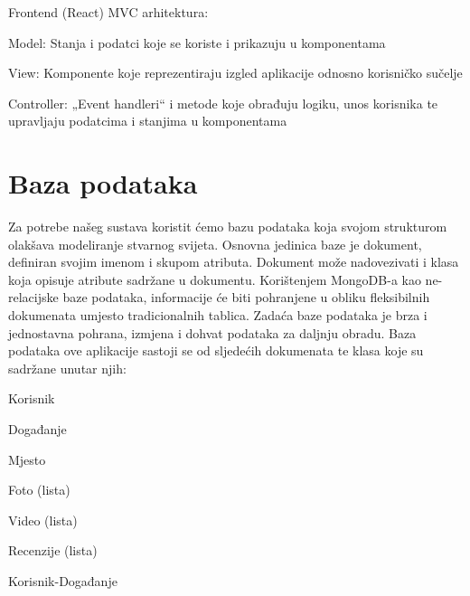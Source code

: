 	Frontend (React) MVC arhitektura:
	
	\begin{packed_enum}
	
		\item Model: Stanja i podatci koje se koriste i prikazuju u komponentama
		\item View: Komponente koje reprezentiraju izgled aplikacije odnosno korisničko sučelje
		\item Controller: „Event handleri“ i metode koje obrađuju logiku, unos korisnika te upravljaju podatcima i stanjima u komponentama 
							
	\end{packed_enum}
		

				
		\section{Baza podataka}
			
			Za potrebe našeg sustava koristit ćemo bazu podataka koja svojom strukturom olakšava modeliranje stvarnog svijeta. Osnovna jedinica baze je dokument, definiran svojim imenom i skupom atributa. Dokument može nadovezivati i klasa koja opisuje atribute sadržane u dokumentu. Korištenjem MongoDB-a kao ne-relacijske baze podataka, informacije će biti pohranjene u obliku fleksibilnih dokumenata umjesto tradicionalnih tablica. Zadaća baze podataka je brza i jednostavna pohrana, izmjena i dohvat podataka za daljnju obradu. Baza podataka ove aplikacije sastoji se od sljedećih dokumenata te klasa koje su sadržane unutar njih:
			\begin{packed_item}
	
						\item Korisnik
						
						\item Događanje
							\begin{packed_item}
							\item Mjesto
							\item Foto (lista)
							\item Video (lista)
							\item Recenzije (lista)
							\end{packed_item}
						
						\item Korisnik-Događanje
						
						
						
			\end{packed_item}
			
